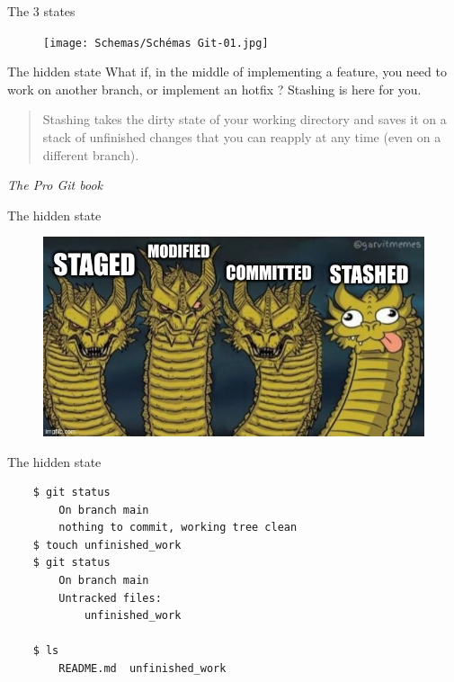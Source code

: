 \documentclass[10pt,aspectratio=169]{beamer}
\begin{document}
\begin{frame}[fragile]{The 3 states}
    \begin{figure}
        \texttt{[image: Schemas/Schémas Git-01.jpg]}
    \end{figure}
\end{frame}

\begin{frame}[fragile]{The hidden state}
    What if, in the middle of implementing a feature, you need to work on another branch, or implement an hotfix ? Stashing is here for you.

    \vspace*{\baselineskip}

    \begin{quote}
        Stashing takes the dirty state of your working directory and saves it on a stack of unfinished changes that you can reapply at any time (even on a different branch).
    \end{quote}
    \begin{flushright}
        \textit{The Pro Git book}
    \end{flushright}
\end{frame}

\begin{frame}[fragile]{The hidden state}
    \begin{figure}
        \includegraphics[scale=0.45]{memes/meme-4-states.jpg}
    \end{figure}
\end{frame}


\begin{frame}[fragile]{The hidden state}
    \begin{verbatim}
    $ git status
        On branch main
        nothing to commit, working tree clean
    $ touch unfinished_work
    $ git status
        On branch main
        Untracked files:
            unfinished_work

    $ ls
        README.md  unfinished_work
    \end{verbatim}
\end{frame}
\end{document}
